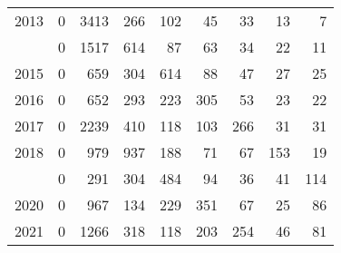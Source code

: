 \documentclass[
]{article}
\begin{document}
\begin{longtable}[t]{lrrrrrrrr}
2013 & 0 & 3413 & 266 & 102 & 45 & 33 & 13 & 7\\
\addlinespace
2014 & 0 & 1517 & 614 & 87 & 63 & 34 & 22 & 11\\
2015 & 0 & 659 & 304 & 614 & 88 & 47 & 27 & 25\\
2016 & 0 & 652 & 293 & 223 & 305 & 53 & 23 & 22\\
2017 & 0 & 2239 & 410 & 118 & 103 & 266 & 31 & 31\\
2018 & 0 & 979 & 937 & 188 & 71 & 67 & 153 & 19\\
\addlinespace
2019 & 0 & 291 & 304 & 484 & 94 & 36 & 41 & 114\\
2020 & 0 & 967 & 134 & 229 & 351 & 67 & 25 & 86\\
2021 & 0 & 1266 & 318 & 118 & 203 & 254 & 46 & 81\\*
\end{longtable}
\end{document}

